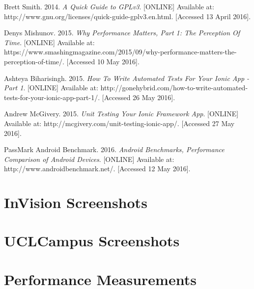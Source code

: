 \documentclass{eplmastersthesis}
\begin{document}
\begin{thebibliography}{9}
\bibitem{} 
Brett Smith. 2014.
\textit{A Quick Guide to GPLv3}. 
[ONLINE] Available at: http://www.gnu.org/licenses/quick-guide-gplv3.en.html. [Accessed 13 April 2016].

\bibitem{}
Denys Mishunov. 2015.
\textit{Why Performance Matters, Part 1: The Perception Of Time}. 
[ONLINE] Available at: https://www.smashingmagazine.com/2015/09/why-performance-matters-the-perception-of-time/. [Accessed 10 May 2016].

\newpage

\bibitem{}
Ashteya Biharisingh. 2015. 
\textit{How To Write Automated Tests For Your Ionic App - Part 1}. 
[ONLINE] Available at: http://gonehybrid.com/how-to-write-automated-tests-for-your-ionic-app-part-1/. [Accessed 26 May 2016].


\bibitem{}
Andrew McGivery. 2015.
\textit{Unit Testing Your Ionic Framework App}. 
[ONLINE] Available at: http://mcgivery.com/unit-testing-ionic-app/. [Accessed 27 May 2016].

\bibitem{}
PassMark Android Benchmark. 2016. 
\textit{Android Benchmarks, Performance Comparison of Android Devices}. 
[ONLINE] Available at: http://www.androidbenchmark.net/. [Accessed 12 May 2016].
\end{thebibliography}
\newpage

\appendix
\chapter{InVision Screenshots}
\chapter{UCLCampus Screenshots}
\chapter{Performance Measurements}



\backcoverpage
\end{document}
